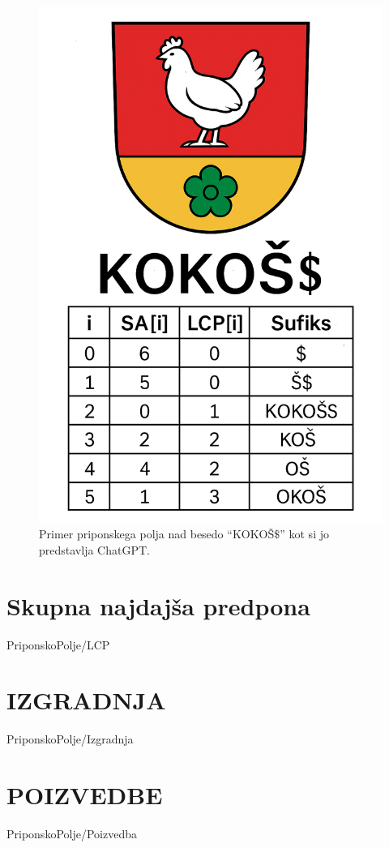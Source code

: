 \begin{figure}[htb]
    \begin{center}
        \includegraphics[width=.5\textwidth]{Slike/ChatGPTSA.png}
        \caption{Primer priponskega polja nad besedo \enquote{KOKOŠ$\$$} kot si jo predstavlja ChatGPT.} 
        \label{fig:ChatGPT}
    \end{center}
\end{figure}



\section{Skupna najdajša predpona}\label{sec:LCP}
{PriponskoPolje/LCP}

\section{IZGRADNJA}\label{sec:SAIzgradnja}
{PriponskoPolje/Izgradnja}

\section{POIZVEDBE}\label{sec:SAPoizvedbe}
{PriponskoPolje/Poizvedba}